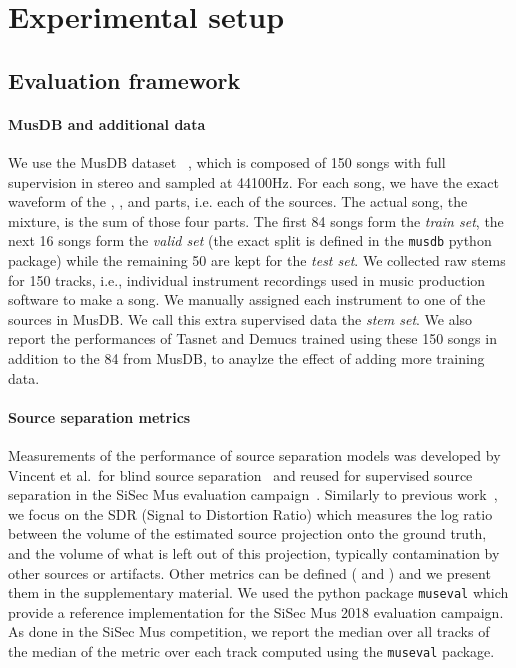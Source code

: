 \section{Experimental setup}
\label{sec:exp}

\subsection{Evaluation framework}

\paragraph{MusDB and additional data}
\label{sec:data}
We use the MusDB dataset~\citep{musdb} , which is composed of 150 songs
with full supervision in stereo and sampled at
44100Hz. For each song, we have the exact waveform of the , ,  and  parts, i.e. each of the sources. The actual song, the mixture,
is the sum of those four parts. The first 84 songs form the \emph{train set}, the next 16 songs form the \emph{valid set} (the exact split is defined in the \texttt{musdb} python package) while the remaining 50 are
kept for the \emph{test set}.
We collected raw stems for 150 tracks, i.e., individual
instrument recordings used in music production software to make a song.
We manually assigned each instrument to one of the sources in MusDB.
We call this extra supervised data the \emph{stem set}.
We also report the performances of Tasnet and Demucs trained
using these 150 songs in addition to the 84 from MusDB, to anaylze the effect of adding more training data.



\paragraph{Source separation metrics}
\label{sec:metrics}
Measurements of the performance of source separation models was
developed by Vincent et al.~for blind source separation~\citep{measures}
and reused for supervised source separation in the SiSec Mus evaluation campaign~\citep{sisec}.
Similarly to previous work~\citep{wavunet,sony_densenet,sony_denselstm}, we focus on the SDR (Signal to Distortion Ratio) which measures the log ratio between the volume
of the estimated source projection onto the ground truth, and the volume of what is left out of this projection, typically contamination by other sources or artifacts. Other metrics can be defined ( and ) and we present them in the supplementary material.
We used the python package
\texttt{museval}
 which provide a reference implementation for the SiSec Mus 2018 evaluation campaign.
As done in the SiSec Mus competition, we report the median over all tracks of the median
of the metric over each track computed using the \texttt{museval} package.

